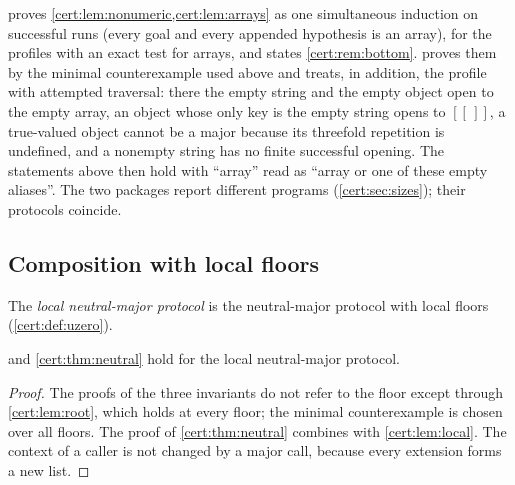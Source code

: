 \begin{remark}[Sources]\label{cert:rem:neutral-sources}
 proves \cref{cert:lem:nonumeric,cert:lem:arrays} as one
simultaneous induction on successful runs (every goal and every appended
hypothesis is an array), for the profiles with an exact test for arrays, and
states \cref{cert:rem:bottom}.  proves them by
the minimal counterexample used above and treats, in addition, the profile
with attempted traversal: there the empty string and the empty object open to
the empty array, an object whose only key is the empty string opens to
$[[\,]]$, a true-valued object cannot be a major because its threefold
repetition is undefined, and a nonempty string has no finite successful
opening. The statements above then hold with ``array'' read as ``array or one
of these empty aliases''. The two packages report different programs
(\cref{cert:sec:sizes}); their protocols coincide.
\end{remark}

\subsection{Composition with local floors}

\begin{definition}\label{cert:def:neutral-local}
The \emph{local neutral-major protocol} is the neutral-major protocol with
local floors (\cref{cert:def:uzero}).
\end{definition}

\begin{theorem}\label{cert:thm:neutral-local}
 and
\cref{cert:thm:neutral} hold for the local neutral-major protocol.
\end{theorem}
\begin{proof}
The proofs of the three invariants do not refer to the floor except through
\cref{cert:lem:root}, which holds at every floor; the minimal counterexample
is chosen over all floors. The proof of \cref{cert:thm:neutral} combines with
\cref{cert:lem:local}. The context of a caller is not changed by a major
call, because every extension forms a new list.
\end{proof}

